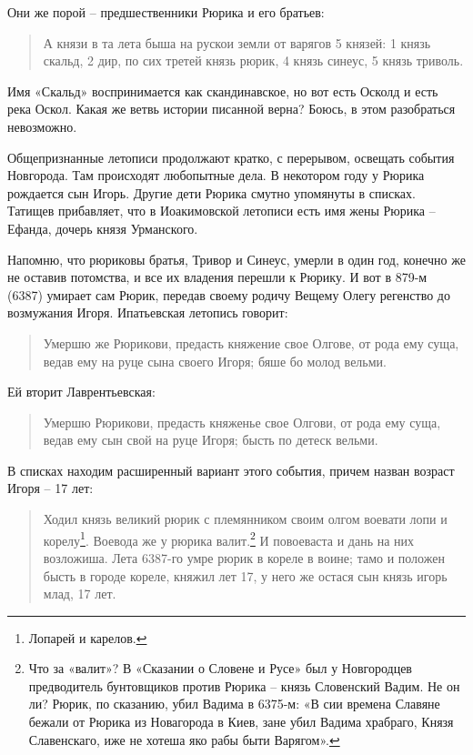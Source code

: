Они же порой – предшественники Рюрика и его братьев:

\begin{quotation}
А князи в та лета быша на рускои земли от варягов 5 князей: 1 князь скальд, 2 дир, по сих третей князь рюрик, 4 князь синеус, 5 князь триволь.
\end{quotation}

Имя «Скальд» воспринимается как скандинавское, но вот есть Осколд и есть река Оскол. Какая же ветвь истории писанной верна? Боюсь, в этом разобраться невозможно.

Общепризнанные летописи продолжают кратко, с перерывом, освещать события Новгорода. Там происходят любопытные дела. В некотором году у Рюрика рождается сын Игорь. Другие дети Рюрика смутно упомянуты в списках. Татищев прибавляет, что в Иоакимовской летописи есть имя жены Рюрика – Ефанда, дочерь князя Урманского.

Напомню, что рюриковы братья, Тривор и Синеус, умерли в один год, конечно же не оставив потомства, и все их владения перешли к Рюрику. И вот в 879-м (6387) умирает сам Рюрик, передав своему родичу Вещему Олегу регенство до возмужания Игоря. Ипатьевская летопись говорит:

\begin{quotation}
Умершю же Рюрикови, предасть княжение свое Олгове, от рода ему суща, ведав ему на руце сына своего Игоря; бяше бо молод вельми.
\end{quotation}

Ей вторит Лаврентьевская:

\begin{quotation}
Умершю Рюрикови, предасть княженье свое Олгови, от рода ему суща, ведав ему сын свой на руце Игоря; бысть по детеск вельми.
\end{quotation}

В списках находим расширенный вариант этого события, причем назван возраст Игоря – 17 лет:

\begin{quotation} 
Ходил князь великий рюрик с племянником своим олгом воевати лопи и корелу\footnote{Лопарей и карелов.}. Воевода же у рюрика валит.\footnote{Что за «валит»? В «Сказании о Словене и Русе» был у Новгородцев предводитель бунтовщиков против Рюрика – князь Словенский Вадим. Не он ли? Рюрик, по сказанию, убил Вадима в 6375-м: «В сии времена Славяне бежали от Рюрика из Новагорода в Киев, зане убил Вадима храбраго, Князя Славенскаго, иже не хотеша яко рабы быти Варягом».} И повоеваста и дань на них возложиша. Лета 6387-го умре рюрик в кореле в воине; тамо и положен бысть в городе кореле, княжил лет 17, у него же остася сын князь игорь млад, 17 лет.
\end{quotation} 

